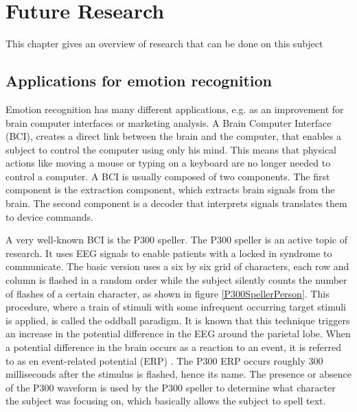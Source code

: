 \chapter{Future Research}
{\samenvatting This chapter gives an overview of research that can be done on this subject}

\section{Applications for emotion recognition}

Emotion recognition has many different applications, e.g. as an improvement for brain computer interfaces or marketing analysis. A Brain Computer Interface (BCI), creates a direct link between the brain and the computer\cite{LangModel}, that enables a subject to control the computer using only his mind. This means that physical actions like moving a mouse or typing on a keyboard are no longer needed to control a computer. A BCI is usually composed of two components. The first component is the extraction component, which extracts brain signals from the brain. The second component is a decoder that interprets signals translates them to device commands.


A very well-known BCI is the P300 speller. The P300 speller is an active topic of research. It uses EEG signals to enable patients with a locked in syndrome to communicate\cite{P300Origin}. The basic version uses a six by six grid of characters, each row and column is flashed in a random order while the subject silently counts the number of flashes of a certain character, as shown in figure \ref{P300SpellerPerson}. This procedure, where a train of stimuli with some infrequent occurring target stimuli is applied, is called the oddball paradigm\cite{PaperThibault}. It is known that this technique triggers an increase in the potential difference in the EEG around the parietal lobe. When a potential difference in the brain occurs as a reaction to an event, it is referred to as en event-related potential (ERP) . The P300 ERP occurs roughly 300 milliseconds after the stimulus is flashed, hence its name\citep{ComparisonClassifications}. The presence or absence of the P300 waveform is used by the P300 speller to determine what character the subject was focusing on, which basically allows the subject to spell text. 

